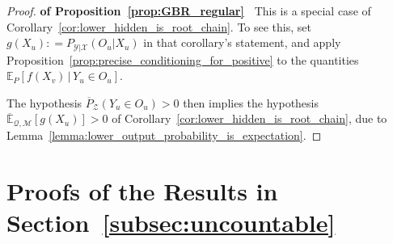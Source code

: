 \documentclass[twoside,11pt]{article}
\newcommand{\states}{\mathcal{X}}
\newcommand{\observs}{\mathcal{Y}}
\newcommand{\uexp}{\overline{\mathbb{E}}_{\rateset,\mathcal{M}}}
\newcommand{\rateset}{\mathcal{Q}}
\newcommand{\coloneqq}{:\!=}
\begin{document}
\begin{proof}{\bf of Proposition~\ref{prop:GBR_regular}~}
This is a special case of Corollary~\ref{cor:lower_hidden_is_root_chain}. To see this, set $g(X_u)\coloneqq P_{\observs\vert\states}(O_u\vert X_u)$ in that corollary's statement, and apply Proposition~\ref{prop:precise_conditioning_for_positive} to the quantities $\mathbb{E}_P[f(X_v)\,\vert\,Y_u\in O_u]$.

The hypothesis $\overline{P}_\mathcal{Z}(Y_u\in O_u)>0$ then implies the hypothesis $\uexp[g(X_u)]>0$ of Corollary~\ref{cor:lower_hidden_is_root_chain}, due to Lemma~\ref{lemma:lower_output_probability_is_expectation}.
\end{proof}

\section{Proofs of the Results in Section~\ref{subsec:uncountable}}
\end{document}
